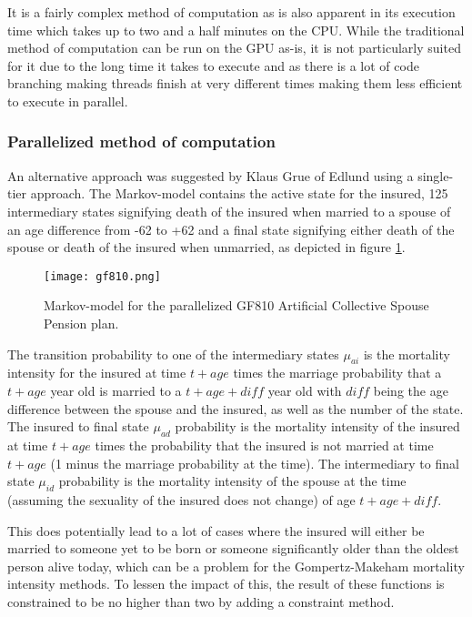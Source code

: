 It is a fairly complex method of computation as is also apparent in its execution time which takes up to two and a half minutes on the CPU.
While the traditional method of computation can be run on the GPU as-is, it is not particularly suited for it due to the long time it takes to execute and as there is a lot of code branching making threads finish at very different times making them less efficient to execute in parallel.

\subsubsection{Parallelized method of computation}\label{subsubsec:gf810parallelized}
An alternative approach was suggested by Klaus Grue of Edlund using a single-tier approach.
The Markov-model contains the active state for the insured, 125 intermediary states signifying death of the insured when married to a spouse of an age difference from -62 to +62 and a final state signifying either death of the spouse or death of the insured when unmarried, as depicted in figure \ref{fig:gf810}.

\begin{figure}[h!]\centering
\texttt{[image: gf810.png]}
\caption{Markov-model for the parallelized GF810 Artificial Collective Spouse Pension plan.\label{fig:gf810}}
\end{figure}
\newcommand*{\diff}{\ensuremath{\mathit{diff}}}
The transition probability to one of the intermediary states $\mu_{ai}$ is the mortality intensity for the insured at time $t + age$ times the marriage probability that a $t + age$ year old is married to a $t + age + \diff$ year old with $\diff$ being the age difference between the spouse and the insured, as well as the number of the state.
The insured to final state $\mu_{ad}$ probability is the mortality intensity of the insured at time $t + age$ times the probability that the insured is not married at time $t + age$ (1 minus the marriage probability at the time).
The intermediary to final state $\mu_{id}$ probability is the mortality intensity of the spouse at the time (assuming the sexuality of the insured does not change) of age $t + age + \diff$.

This does potentially lead to a lot of cases where the insured will either be married to someone yet to be born or someone significantly older than the oldest person alive today, which can be a problem for the Gompertz-Makeham mortality intensity methods.
To lessen the impact of this, the result of these functions is constrained to be no higher than two by adding a constraint method.

